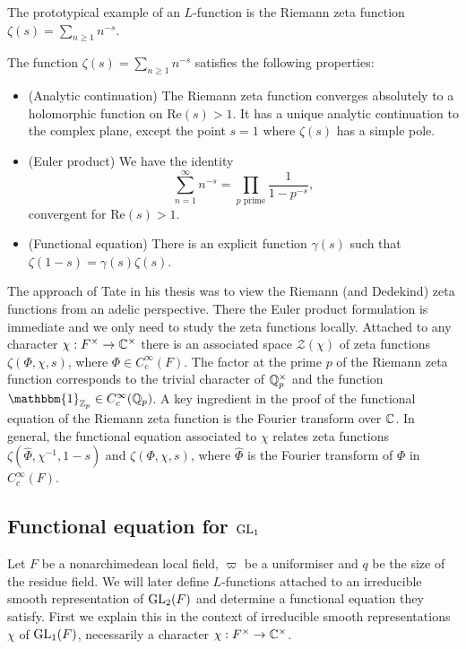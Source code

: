 The prototypical example of an $L$-function is the Riemann zeta function $\zeta(s) = \sum_{n \geq 1} n^{-s}$.

\begin{prop}
    The function $\zeta(s) = \sum_{n \geq 1} n^{-s}$ satisfies the following properties:
    \begin{itemize}
        \item (Analytic continuation) The Riemann zeta function converges absolutely to a holomorphic function on $\mathrm{Re}(s)>1$. It has a unique analytic continuation to the complex plane, except the point $s=1$ where $\zeta(s)$ has a simple pole.
        \item (Euler product) We have the identity $$\sum\limits_{n=1}^\infty n^{-s} = \prod\limits_{p \text{ prime}} \frac{1}{1-p^{-s}},$$ convergent for $\mathrm{Re}(s)>1$.
        \item (Functional equation) There is an explicit function $\gamma(s)$ such that $\zeta(1-s)=\gamma(s)\zeta(s)$.
    \end{itemize}
\end{prop}

The approach of Tate in his thesis was to view the Riemann (and Dedekind) zeta functions from an adelic perspective. There the Euler product formulation is immediate and we only need to study the zeta functions locally. Attached to any character $\chi:F^\times \to \mathbb{C}^\times$ there is an associated space $\mathcal Z(\chi)$ of zeta functions $\zeta(\Phi,\chi,s)$, where $\Phi \in C_c^\infty(F)$. The factor at the prime $p$ of the Riemann zeta function corresponds to the trivial character of $\mathbb{Q}_p^\times$ and the function $\mathbbm{1}_{\ZZ_p} \in C_c^\infty(\QQ_p)$. A key ingredient in the proof of the functional equation of the Riemann zeta function is the Fourier transform over $\mathbb{C}$. In general, the functional equation associated to $\chi$ relates zeta functions $\zeta(\hat{\Phi},\chi^{-1},1-s)$ and $\zeta(\Phi,\chi,s)$, where $\hat{\Phi}$ is the Fourier transform of $\Phi$ in $C_c^\infty(F)$. 







\subsection{Functional equation for \texorpdfstring{$\mathrm{GL}_1$}{TEXT}}

Let $F$ be a nonarchimedean local field, $\varpi$ be a uniformiser and $q$ be the size of the residue field. We will later define $L$-functions attached to an irreducible smooth representation of $\mathrm{GL}_2(F)$ and determine a functional equation they satisfy. First we explain this in the context of irreducible smooth representations $\chi$ of $\mathrm{GL}_1(F)$, necessarily a character $\chi: F^\times \to \mathbb{C}^\times$.

